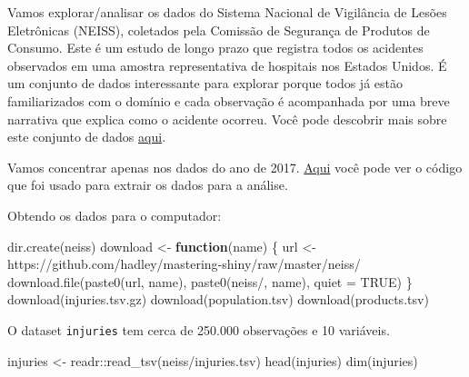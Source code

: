 \documentclass[
]{book}
\newenvironment{Shaded}{\begin{snugshade}}{\end{snugshade}}
\newcommand{\AttributeTok}[1]{\textcolor[rgb]{0.77,0.63,0.00}{#1}}
\newcommand{\ConstantTok}[1]{\textcolor[rgb]{0.00,0.00,0.00}{#1}}
\newcommand{\ControlFlowTok}[1]{\textcolor[rgb]{0.13,0.29,0.53}{\textbf{#1}}}
\newcommand{\FunctionTok}[1]{\textcolor[rgb]{0.00,0.00,0.00}{#1}}
\newcommand{\NormalTok}[1]{#1}
\newcommand{\OtherTok}[1]{\textcolor[rgb]{0.56,0.35,0.01}{#1}}
\newcommand{\SpecialCharTok}[1]{\textcolor[rgb]{0.00,0.00,0.00}{#1}}
\newcommand{\StringTok}[1]{\textcolor[rgb]{0.31,0.60,0.02}{#1}}
\begin{document}
Vamos explorar/analisar os dados do Sistema Nacional de Vigilância de Lesões Eletrônicas (NEISS), coletados pela Comissão de Segurança de Produtos de Consumo. Este é um estudo de longo prazo que registra todos os acidentes observados em uma amostra representativa de hospitais nos Estados Unidos. É um conjunto de dados interessante para explorar porque todos já estão familiarizados com o domínio e cada observação é acompanhada por uma breve narrativa que explica como o acidente ocorreu. Você pode descobrir mais sobre este conjunto de dados \href{https://github.com/hadley/neiss}{aqui}.

Vamos concentrar apenas nos dados do ano de 2017. \href{https://github.com/hadley/mastering-shiny/blob/master/neiss/data.R}{Aqui} você pode ver o código que foi usado para extrair os dados para a análise.

Obtendo os dados para o computador:

\begin{Shaded}
\begin{Highlighting}[]
\FunctionTok{dir.create}\NormalTok{(}\StringTok{\textquotesingle{}neiss\textquotesingle{}}\NormalTok{)}
\NormalTok{download }\OtherTok{\textless{}{-}} \ControlFlowTok{function}\NormalTok{(name) \{}
\NormalTok{ url }\OtherTok{\textless{}{-}} \StringTok{\textquotesingle{}https://github.com/hadley/mastering{-}shiny/raw/master/neiss/\textquotesingle{}}
 \FunctionTok{download.file}\NormalTok{(}\FunctionTok{paste0}\NormalTok{(url, name), }\FunctionTok{paste0}\NormalTok{(}\StringTok{\textquotesingle{}neiss/\textquotesingle{}}\NormalTok{, name), }\AttributeTok{quiet =} \ConstantTok{TRUE}\NormalTok{)}
\NormalTok{\}}
\FunctionTok{download}\NormalTok{(}\StringTok{\textquotesingle{}injuries.tsv.gz\textquotesingle{}}\NormalTok{)}
\FunctionTok{download}\NormalTok{(}\StringTok{\textquotesingle{}population.tsv\textquotesingle{}}\NormalTok{)}
\FunctionTok{download}\NormalTok{(}\StringTok{\textquotesingle{}products.tsv\textquotesingle{}}\NormalTok{)}
\end{Highlighting}
\end{Shaded}

O dataset \texttt{injuries} tem cerca de 250.000 observações e 10 variáveis.

\begin{Shaded}
\begin{Highlighting}[]
\NormalTok{injuries }\OtherTok{\textless{}{-}}\NormalTok{ readr}\SpecialCharTok{::}\FunctionTok{read\_tsv}\NormalTok{(}\StringTok{\textquotesingle{}neiss/injuries.tsv\textquotesingle{}}\NormalTok{)}
\FunctionTok{head}\NormalTok{(injuries)}
\FunctionTok{dim}\NormalTok{(injuries)}
\end{Highlighting}
\end{Shaded}
\end{document}
